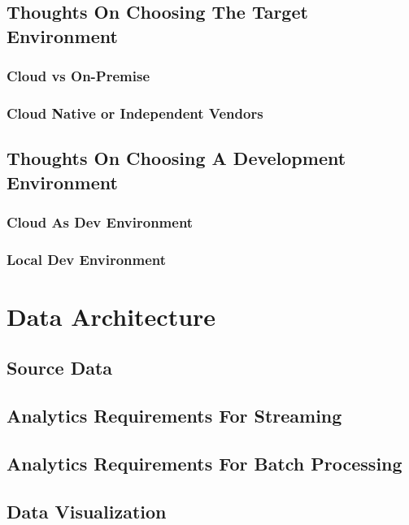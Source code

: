 \documentclass[12pt]{scrartcl} %
\begin{document}
\subsection{Thoughts On Choosing The Target Environment}

\subsubsection{Cloud vs On-Premise}

\subsubsection{Cloud Native or Independent Vendors}

\subsection{Thoughts On Choosing A Development Environment}

\subsubsection{Cloud As Dev Environment}

\subsubsection{Local Dev Environment}




\section{Data Architecture}

\subsection{Source Data}

\subsection{Analytics Requirements For Streaming}

\subsection{Analytics Requirements For Batch Processing}

\subsection{Data Visualization}
\end{document}
